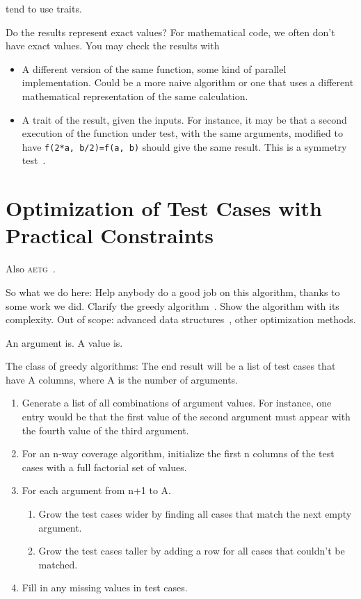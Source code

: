 \documentclass{juliacon}
\begin{document}
tend to use traits.

\vskip 6pt
Do the results represent exact values? For mathematical code, we often don't have exact values. You may check the results with
\begin{itemize}
   \item A different version of the same function, some kind of parallel implementation. Could be a more naive algorithm or one that uses a different mathematical representation of the same calculation.
   \item A trait of the result, given the inputs. For instance, it may be that a second execution of the function under test, with the same arguments, modified to have \verb|f(2*a, b/2)=f(a, b)| should give the same result. This is a symmetry test~\cite{Segura2016-qh}.
\end{itemize}

\section{Optimization of Test Cases with Practical Constraints}
Also \textsc{aetg}~\cite{Cohen1997-lb}.

\vskip 6pt
So what we do here: Help anybody do a good job on this algorithm, thanks to some work we did.
Clarify the greedy algorithm~\cite{Lei2008-xt}. Show the algorithm with its complexity.
Out of scope: advanced data structures~\cite{Segall2011-jv}, other optimization methods.

\vskip 6pt
An argument is. A value is.

\vskip 6pt
The class of greedy algorithms:
The end result will be a list of test cases that have A columns, where A is the number of arguments.
\begin{enumerate}
   \item Generate a list of all combinations of argument values. For instance, one entry would be that the first value of the second argument must appear with the fourth value of the third argument.
   \item For an n-way coverage algorithm, initialize the first n columns of the test cases with a full factorial set of values.
   \item For each argument from n+1 to A.
   \begin{enumerate}
      \item Grow the test cases wider by finding all cases that match the next empty argument.
      \item Grow the test cases taller by adding a row for all cases that couldn't be matched.
   \end{enumerate}
   \item Fill in any missing values in test cases.
\end{enumerate}
\end{document}
